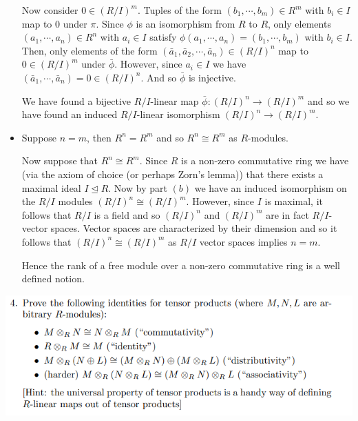 \documentclass[12pt,letterpaper,boxed]{hmcpset}
\newcommand{\normal}{\unlhd} %
\begin{document}
\begin{solution}
\begin{itemize}
Now consider $0 \in (R/I)^m$. Tuples of the form $(b_1, \cdots, b_m)
\in R^m$ with $b_i \in I$ map to $0$ under $\pi$. Since $\phi$ is an
isomorphism from $R$ to $R$, only elements $(a_1, \cdots, a_n) \in
R^n$ with $a_i \in I$ satisfy $\phi(a_1, \cdots, a_n) = (b_1, \cdots,
b_m)$ with $b_i \in I$. Then, only elements of the form
$(\bar a_1, \bar a_2, \cdots, \bar a_n) \in (R/I)^n$ map to $0 \in
(R/I)^m$ under $\bar \phi$. However, since $a_i \in I$ we have 
$(\bar a_1, \cdots, \bar a_n) = 0 \in (R/I)^n$. And so $\bar \phi$ is
injective.

We have found a bijective $R/I$-linear map $\bar\phi: (R/I)^n \to
(R/I)^m$ and so we have found an induced $R/I$-linear isomorphism
$(R/I)^n \to (R/I)^m$. 

\item 
Suppose $n = m$, then $R^n = R^m$ and so $R^n \cong R^m$ as
$R$-modules.

Now suppose that $R^n \cong R^m$. Since $R$ is a non-zero commutative
ring we have (via the axiom of choice (or perhaps Zorn's lemma)) 
that there exists a maximal ideal $I \normal R$. 
Now by part $(b)$ we have an induced isomorphism on the $R/I$ modules
$(R/I)^n \cong (R/I)^m$. However, since $I$ is maximal, it follows
that $R/I$ is a field and so $(R/I)^n$ and $(R/I)^m$ are in fact
$R/I$-vector spaces. Vector spaces are characterized by their
dimension and so it follows that $(R/I)^n \cong (R/I)^m$ as $R/I$
vector spaces implies $n = m$. 

Hence the rank of a free module over a non-zero commutative ring is a
well defined notion. 

\end{itemize}
\end{solution}

\newpage


\begin{problem}
	\includegraphics[scale=0.8]{4.png}
	\hfill
\end{problem}
\end{document}
